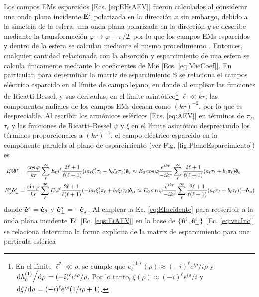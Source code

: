 Los campos EMs esparcidos [Ecs. \eqref{eq:EHsAEV}] fueron calculados al considerar una onda plana incidente $\vb{E}^i$ polarizada en la dirección $x$ sin embargo, debido a la simetría de la esfera, una onda plana polarizada en la dirección $y$ se describe mediante la transformación $\varphi\to\varphi+\pi/2$, por lo que los campos EMs esparcidos y dentro de la esfera se calculan mediante el mismo procedimiento \cite{bohren1998absorption}. Entonces, cualquier cantidad relacionada con la absorción y esparcimiento de una esfera se calcula únicamente mediante lo coeficientes de Mie [Ecs. \eqref{eq:MieCoef}]. En particular, para determinar la matriz de esparcimiento $\mathbb{S}$ se relaciona el campos eléctrico esparcido en el límite de campo lejano, en donde al emplear las funciones de Ricatti-Bessel, y sus derivadas, en el límite asintótico\footnote{En el límite $\ell^2 \ll \rho$, se cumple que $h_\ell^{(1)}(\rho)\approx (-i)^\ell e^{i\rho}/i\rho$ y $\dv*{h_\ell^{(1)}}{\rho} = (-i)^\ell e^{i\rho}/\rho$. Por lo tanto,  $\xi(\rho)\approx (-i)^\ell e^{i\rho}/i$ y $\dv*{\xi}{\rho} = (-i)^\ell e^{i\rho}(1/i\rho + 1)$.} $\ell \ll kr$, las componentes radiales de los campos EMs decaen como $(kr)^{-2}$, por lo que es despreciable. Al escribir los armónicos esféricos  [Ecs. \eqref{eq:AEV}] en términos de $\pi_\ell$, $\tau_\ell$ y las funciones de Ricatti--Bessel $\psi$ y $\xi$ en el límite asintótico despreciando los términos proporcionales a $(kr)^{-1}$, el campo eléctrico esparcido en la componente paralela al plano de esparcimiento (ver Fig. \ref{fig:PlanoEsparcimiento}) es
	\begin{align*}
	E_\theta^s \vu{e}_\parallel^s &=\frac{\cos\varphi}{kr}
								\sum_\ell^\infty E_0i^\ell\frac{2\ell+1}{\ell(\ell+1)}
						(i a_\ell\xi_\ell'\tau_\ell-b_\ell\xi_\ell\pi_\ell)\vu{e}_\theta
			\approx E_0\cos\varphi\frac{e^{ikr}}{-ikr}\sum_\ell^\infty\frac{2\ell+1}{\ell(\ell+1)}
				( a_\ell \tau_\ell + b_\ell\pi_\ell )\vu{e}_\theta \\
		E_\varphi^s \vu{e}_\perp^s &= \frac{\sin\varphi}{kr}
							\sum_\ell^\infty E_0i^\ell\frac{2\ell+1}{\ell(\ell+1)}						
							(-ia_\ell\xi_\ell'\pi_\ell+b_\ell\xi_\ell\tau_\ell)\vu{e}_\varphi 
			\approx E_0\sin\varphi\frac{e^{ikr}}{-ikr}\sum_\ell^\infty\frac{2\ell+1}{\ell(\ell+1)}					(a_\ell\pi_\ell+b_\ell\tau_\ell)(-\vu{e}_\varphi)
	\end{align*}
donde $\vu{e}_\parallel^s =\vu{e}_\theta$ y $\vu{e}_\perp^s=-\vu{e}_\varphi$. Al emplear la Ec. \eqref{eq:EIncidente} para reescribir a la onda plana incidente $\vb{E}^i$ [Ec. \eqref{eqs:EiAEV}] en la base de $\{\vu{e}_\parallel^i,\vu{e}_\perp^i\}$ [Ec. \eqref{eq:vecInc}] se relaciona determina la forma explícita de la matriz de esparcimiento para una partícula esférica\vspace*{-.5em}

